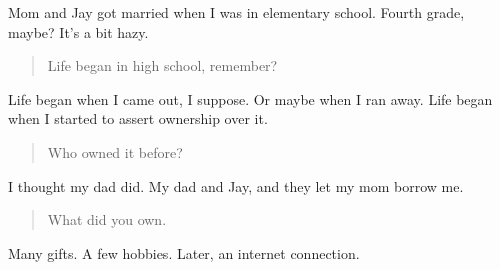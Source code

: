 Mom and Jay got married when I was in elementary school. Fourth grade, maybe? It's a bit hazy.

\begin{quote}
Life began in high school, remember?
\end{quote}

Life began when I came out, I suppose. Or maybe when I ran away. Life began when I started to assert ownership over it.

\begin{quote}
Who owned it before?
\end{quote}

I thought my dad did. My dad and Jay, and they let my mom borrow me.

\begin{quote}
What did you own.
\end{quote}

Many gifts. A few hobbies. Later, an internet connection.
